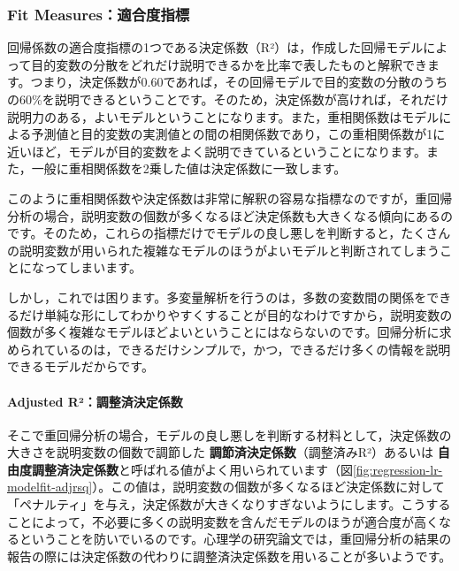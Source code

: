 \documentclass[
  12pt,
  a5jpaper,
  lualatex, ja=standard]{bxjsbook}
\renewcommand{\emph}[1]{\textbf{\color{emph} #1}}
\begin{document}
\hypertarget{fit-measuresux9069ux5408ux5ea6ux6307ux6a19}{%
\subsubsection*{Fit Measures：適合度指標}\label{fit-measuresux9069ux5408ux5ea6ux6307ux6a19}}

回帰係数の適合度指標の1つである決定係数（R²）は，作成した回帰モデルによって目的変数の分散をどれだけ説明できるかを比率で表したものと解釈できます。つまり，決定係数が0.60であれば，その回帰モデルで目的変数の分散のうちの60\%を説明できるということです。そのため，決定係数が高ければ，それだけ説明力のある，よいモデルということになります。また，重相関係数はモデルによる予測値と目的変数の実測値との間の相関係数であり，この重相関係数が1に近いほど，モデルが目的変数をよく説明できているということになります。また，一般に重相関係数を2乗した値は決定係数に一致します。

このように重相関係数や決定係数は非常に解釈の容易な指標なのですが，重回帰分析の場合，説明変数の個数が多くなるほど決定係数も大きくなる傾向にあるのです。そのため，これらの指標だけでモデルの良し悪しを判断すると，たくさんの説明変数が用いられた複雑なモデルのほうがよいモデルと判断されてしまうことになってしまいます。

しかし，これでは困ります。多変量解析を行うのは，多数の変数間の関係をできるだけ単純な形にしてわかりやすくすることが目的なわけですから，説明変数の個数が多く複雑なモデルほどよいということにはならないのです。回帰分析に求められているのは，できるだけシンプルで，かつ，できるだけ多くの情報を説明できるモデルだからです。

\hypertarget{adjusted-ruxb2ux8abfux6574ux6e08ux6c7aux5b9aux4fc2ux6570}{%
\paragraph*{Adjusted R²：調整済決定係数}\label{adjusted-ruxb2ux8abfux6574ux6e08ux6c7aux5b9aux4fc2ux6570}}

そこで重回帰分析の場合，モデルの良し悪しを判断する材料として，決定係数の大きさを説明変数の個数で調節した\emph{調節済決定係数}（調整済みR²）あるいは\emph{自由度調整済決定係数}と呼ばれる値がよく用いられています（図\ref{fig:regression-lr-modelfit-adjrsq}）。この値は，説明変数の個数が多くなるほど決定係数に対して「ペナルティ」を与え，決定係数が大きくなりすぎないようにします。こうすることによって，不必要に多くの説明変数を含んだモデルのほうが適合度が高くなるということを防いでいるのです。心理学の研究論文では，重回帰分析の結果の報告の際には決定係数の代わりに調整済決定係数を用いることが多いようです。
\end{document}
